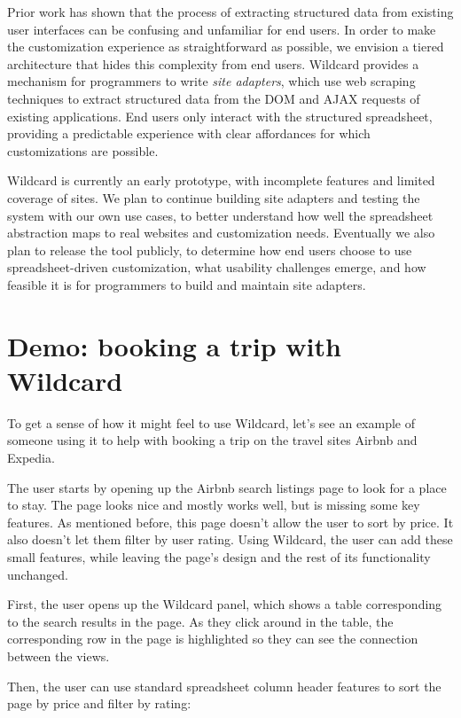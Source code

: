 \documentclass[english,submission]{programming}
\begin{document}
Prior work \autocite{huynh2006} has shown that the process of extracting
structured data from existing user interfaces can be confusing and
unfamiliar for end users. In order to make the customization experience
as straightforward as possible, we envision a tiered architecture that
hides this complexity from end users. Wildcard provides a mechanism for
programmers to write \emph{site adapters}, which use web scraping
techniques to extract structured data from the DOM and AJAX requests of
existing applications. End users only interact with the structured
spreadsheet, providing a predictable experience with clear affordances
for which customizations are possible.

Wildcard is currently an early prototype, with incomplete features and
limited coverage of sites. We plan to continue building site adapters
and testing the system with our own use cases, to better understand how
well the spreadsheet abstraction maps to real websites and customization
needs. Eventually we also plan to release the tool publicly, to
determine how end users choose to use spreadsheet-driven customization,
what usability challenges emerge, and how feasible it is for programmers
to build and maintain site adapters.

\hypertarget{demo-booking-a-trip-with-wildcard}{%
\section{Demo: booking a trip with
Wildcard}\label{demo-booking-a-trip-with-wildcard}}

To get a sense of how it might feel to use Wildcard, let's see an
example of someone using it to help with booking a trip on the travel
sites Airbnb and Expedia.

The user starts by opening up the Airbnb search listings page to look
for a place to stay. The page looks nice and mostly works well, but is
missing some key features. As mentioned before, this page doesn't allow
the user to sort by price. It also doesn't let them filter by user
rating. Using Wildcard, the user can add these small features, while
leaving the page's design and the rest of its functionality unchanged.

First, the user opens up the Wildcard panel, which shows a table
corresponding to the search results in the page. As they click around in
the table, the corresponding row in the page is highlighted so they can
see the connection between the views.

Then, the user can use standard spreadsheet column header features to
sort the page by price and filter by rating:
\end{document}
